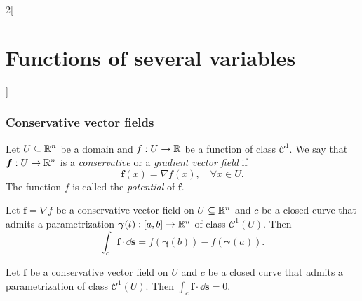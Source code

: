 \documentclass[../../../main.tex]{subfiles}
\begin{document}
\begin{multicols}{2}[\section{Functions of several variables}]
\subsubsection*{Conservative vector fields}
\begin{definition}
Let $U\subseteq\mathbb{R}^n$ be a domain and $f:U\rightarrow\mathbb{R} $ be a function of class $\mathcal{C}^1$. We say that $\boldsymbol{f}:U\rightarrow\mathbb{R}^n$ is a \textit{conservative} or a \textit{gradient vector field} if $$\boldsymbol{f}(x)=\nabla f(x),\quad \forall x\in U.$$ The function $f$ is called the \textit{potential} of $\boldsymbol{f}$.
\end{definition}
\begin{theorem}
Let $\boldsymbol{f}=\nabla f$ be a conservative vector field on $U\subseteq\mathbb{R}^n$ and $c$ be a closed curve that admits a parametrization $\boldsymbol{\gamma}(t):[a,b]\rightarrow\mathbb{R}^n$ of class $\mathcal{C}^1(U)$. Then $$\int_c\boldsymbol{f}\cdot \dd \textbf{s}=f(\boldsymbol{\gamma}(b))-f(\boldsymbol{\gamma}(a)).$$
\end{theorem}
\begin{corollary}
Let $\boldsymbol{f}$ be a conservative vector field on $U$ and $c$ be a closed curve that admits a parametrization of class $\mathcal{C}^1(U)$. Then $\displaystyle\int_c\boldsymbol{f}\cdot \dd \textbf{s}=0$.
\end{corollary}

\end{multicols}
\end{document}
